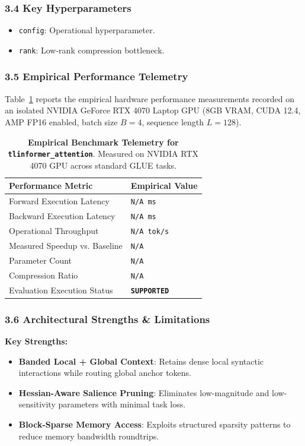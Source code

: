 \subsubsection*{3.4 Key Hyperparameters}
\begin{itemize}
    \item \texttt{config}: Operational hyperparameter.
    \item \texttt{rank}: Low-rank compression bottleneck.
\end{itemize}

\subsubsection*{3.5 Empirical Performance Telemetry}
Table~\ref{tab:telemetry_tlinformer_attention} reports the empirical hardware performance measurements recorded on an isolated NVIDIA GeForce RTX 4070 Laptop GPU (8GB VRAM, CUDA 12.4, AMP FP16 enabled, batch size $B=4$, sequence length $L=128$).

\begin{table}[h]
\centering
\small
\caption{\textbf{Empirical Benchmark Telemetry for \texttt{tlinformer\_attention}}. Measured on NVIDIA RTX 4070 GPU across standard GLUE tasks.}
\label{tab:telemetry_tlinformer_attention}
\begin{tabularx}{\columnwidth}{lX}
\toprule
\textbf{Performance Metric} & \textbf{Empirical Value} \\
\midrule
Forward Execution Latency & \texttt{N/A ms} \\
Backward Execution Latency & \texttt{N/A ms} \\
Operational Throughput & \texttt{N/A tok/s} \\
Measured Speedup vs. Baseline & \texttt{N/A} \\
Parameter Count & \texttt{N/A} \\
Compression Ratio & \texttt{N/A} \\
Evaluation Execution Status & \textbf{\texttt{SUPPORTED}} \\
\bottomrule
\end{tabularx}
\end{table}

\subsubsection*{3.6 Architectural Strengths \& Limitations}
\textbf{Key Strengths:}
\begin{itemize}
    \item \textbf{Banded Local + Global Context}: Retains dense local syntactic interactions while routing global anchor tokens.
    \item \textbf{Hessian-Aware Salience Pruning}: Eliminates low-magnitude and low-sensitivity parameters with minimal task loss.
    \item \textbf{Block-Sparse Memory Access}: Exploits structured sparsity patterns to reduce memory bandwidth roundtrips.
\end{itemize}

